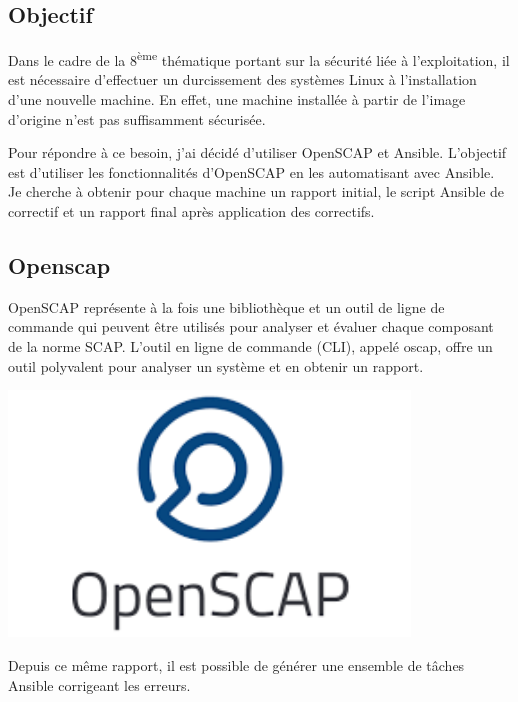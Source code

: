 \documentclass[12pt, a4paper, twoside]{article}
\begin{document}
\subsection{Objectif}
Dans le cadre de la 8\textsuperscript{ème} thématique portant sur la sécurité liée à l'exploitation, il est nécessaire d'effectuer un durcissement des systèmes \gls{Linux} à l'installation d'une nouvelle machine. 
En effet, une machine installée à partir de l'image d'origine n'est pas suffisamment sécurisée.

Pour répondre à ce besoin, j'ai décidé d'utiliser \gls{OpenSCAP} et \gls{Ansible}. 
L'objectif est d'utiliser les fonctionnalités d'\gls{OpenSCAP} en les automatisant avec \gls{Ansible}.
Je cherche à obtenir pour chaque machine un rapport initial, le script \gls{Ansible} de correctif et un rapport final après application des correctifs. 

\subsection{Openscap}
\noindent%
\begin{minipage}{.7\textwidth}%
\gls{OpenSCAP} représente à la fois une bibliothèque et un outil de ligne de commande qui peuvent être utilisés pour analyser et évaluer chaque composant de la norme \gls{SCAP}. 
L'outil en ligne de commande (\gls{CLI}), appelé oscap, offre un outil polyvalent pour analyser un système et en obtenir un rapport. \cite{OpenSCAP} \\
\end{minipage}%
\hfill
\begin{minipage}{.3\textwidth}%
\begin{center}
\includegraphics[width=0.8\textwidth]{src/logo_openscap.png}
\end{center}
\end{minipage}%

Depuis ce même rapport, il est possible de générer une ensemble de tâches \gls{Ansible} corrigeant les erreurs.
\end{document}
